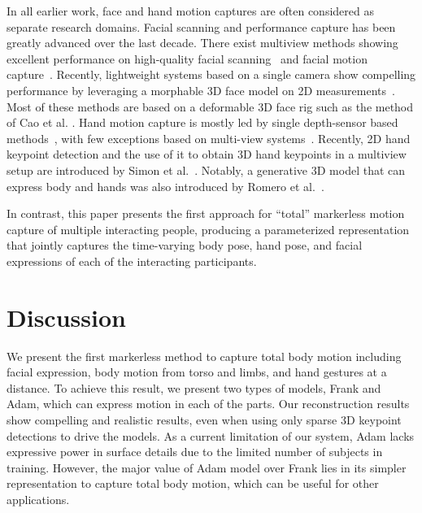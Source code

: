 In all earlier work, face and hand motion captures are often considered as separate research domains.  Facial scanning and performance capture has been greatly advanced over the last decade. There exist multiview methods showing excellent performance on high-quality facial scanning~\cite{Beeler:SIGGRAPH2010,ghosh2011multiview} and facial motion capture~\cite{Beeler:SIGGRAPH2011, bradley2010high, valgaerts2012lightweight}. Recently, lightweight systems based on a single camera show compelling performance by leveraging a morphable 3D face model on 2D measurements~\cite{garrido-tog-2013, Torre15, li2013realtime, thies2016face2face, cao2014facewarehouse, cao2015real, wu2016anatomically}. Most of these methods are based on a deformable 3D face rig such as the method of Cao et al. \cite{cao2014facewarehouse}. Hand motion capture is mostly led by single depth-sensor based methods~\cite{Oikonomidis-12, Tang-14, Tompson-14a, Keskin-12,Xu-13,Sun-15,Wan-16, Sridhar-13, Sharp-15, Sridha-15, Tzionas-16, Ye-16}, with few exceptions based on multi-view systems~\cite{Ballan-12, Sridhar-13, MANO:SIGGRAPHASIA:2017}. Recently, 2D hand keypoint detection and the use of it to obtain 3D hand keypoints in a multiview setup are introduced by Simon et al.~\cite{simon2017hand}. Notably, a generative 3D model that can express body and hands was also introduced by Romero et al.~\cite{MANO:SIGGRAPHASIA:2017}. 

In contrast, this paper presents the first approach for ``total'' markerless motion capture of multiple interacting people, producing a parameterized representation that jointly captures the time-varying body pose, hand pose, and facial expressions of each of the interacting participants. %







\section{Discussion}
We present the first markerless method to capture total body motion including facial expression, body motion from torso and limbs, and hand gestures at a distance. To achieve this result, we present two types of models, Frank and Adam, which can express motion in each of the parts. Our reconstruction results show compelling and realistic results, even when using only sparse 3D keypoint detections to drive the models.  As a current limitation of our system, Adam lacks expressive power in surface details due to the limited number of subjects in training. However, the major value of Adam model over Frank lies in its simpler representation to capture total body motion, which can be useful for other applications.

